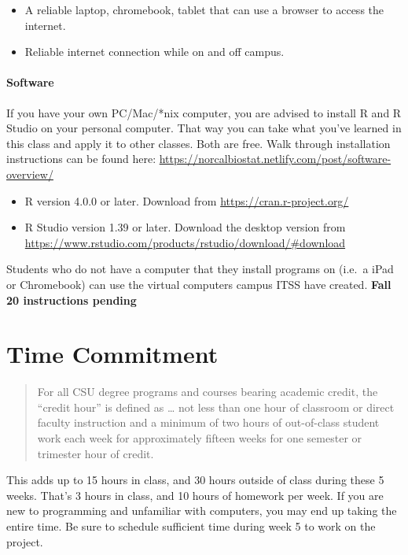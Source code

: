 \documentclass[
  11pt,
]{article}
\providecommand{\tightlist}{%
  \setlength{\itemsep}{0pt}\setlength{\parskip}{0pt}}
\begin{document}
\begin{itemize}
\tightlist
\item
  A reliable laptop, chromebook, tablet that can use a browser to access
  the internet.
\item
  Reliable internet connection while on and off campus.
\end{itemize}

\hypertarget{software}{%
\paragraph{Software}\label{software}}

If you have your own PC/Mac/*nix computer, you are advised to install R
and R Studio on your personal computer. That way you can take what
you've learned in this class and apply it to other classes. Both are
free. Walk through installation instructions can be found here:
\url{https://norcalbiostat.netlify.com/post/software-overview/}

\begin{itemize}
\tightlist
\item
  R version 4.0.0 or later. Download from
  \url{https://cran.r-project.org/}
\item
  R Studio version 1.39 or later. Download the desktop version from
  \url{https://www.rstudio.com/products/rstudio/download/\#download}
\end{itemize}

Students who do not have a computer that they install programs on
(i.e.~a iPad or Chromebook) can use the virtual computers campus ITSS
have created. {\textbf{Fall 20 instructions pending}}

\hypertarget{time-commitment}{%
\section{Time Commitment}\label{time-commitment}}

\begin{quote}
For all CSU degree programs and courses bearing academic credit, the
``credit hour'' is defined as \ldots{} not less than one hour of
classroom or direct faculty instruction and a minimum of two hours of
out-of-class student work each week for approximately fifteen weeks for
one semester or trimester hour of credit.
\end{quote}

This adds up to 15 hours in class, and 30 hours outside of class during
these 5 weeks. That's 3 hours in class, and 10 hours of homework per
week. If you are new to programming and unfamiliar with computers, you
may end up taking the entire time. Be sure to schedule sufficient time
during week 5 to work on the project.
\end{document}
